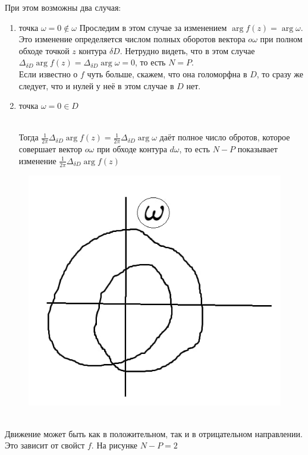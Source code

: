 \documentclass[a4paper, 12pt]{report}
\begin{document}
\par\bigskip При этом возможны два случая:
\begin{enumerate}
    \item точка \(\omega = 0 \not\in \omega  \) Проследим в этом случае за изменением \(\arg f(z) = \arg \omega \). Это изменение определяется числом полных оборотов вектора \(o\omega\) при полном обходе точкой \(z\) контура \(\delta D \). Нетрудно видеть, что в этом случае \(\Delta_{\delta D} \arg f(z) = \Delta_{\delta D} \arg \omega = 0\), то есть \(N=P\).
\\Если известно о \(f\) чуть больше, скажем, что она голоморфна в \(D\), то сразу же следует, что и нулей у неё в этом случае в \(D\) нет.

\item точка \(\omega = 0 \in D  \)
\par\\Тогда \( \frac{1}{2\pi}  \Delta_{\delta D} \arg f(z) = \frac{1}{2\pi}  \Delta_{\delta D} \arg \omega \) даёт полное число обротов, которое совершает вектор \( o\omega\) при обходе контура \(d\omega\), то есть \(N-P\) показывает изменение  \( \frac{1}{2\pi}  \Delta_{\delta D} \arg f(z) \)

\end{enumerate}
\begin{figure} 
    \vspace{-6ex}
    \includegraphics[width=3 cm]{argument/4.jpg}
\end{figure}

\\ Движение может быть как в положительном, так и в отрицательном направлении. Это зависит от свойст \(f\). На рисунке \(N-P=2\)

\nextline
\par\bigskip
\end{document}
